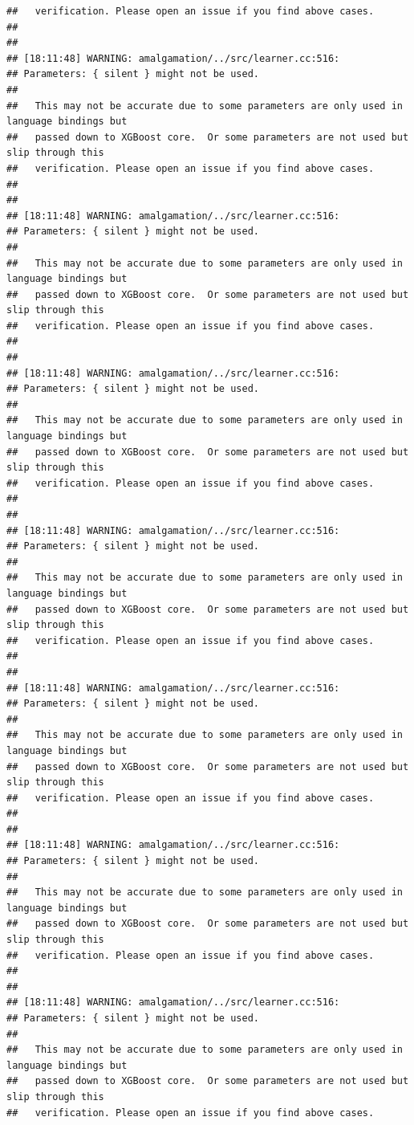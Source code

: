 \documentclass[AMS,STIX2COL]{WileyNJD-v2}\usepackage[]{graphicx}\usepackage[]{color}
\makeatletter
\newenvironment{kframe}{%
 \def\at@end@of@kframe{}%
 \ifinner\ifhmode%
  \def\at@end@of@kframe{\end{minipage}}%
  \begin{minipage}{\columnwidth}%
 \fi\fi%
 \def\FrameCommand##1{\hskip\@totalleftmargin \hskip-\fboxsep
 \colorbox{shadecolor}{##1}\hskip-\fboxsep
     \hskip-\linewidth \hskip-\@totalleftmargin \hskip\columnwidth}%
 \MakeFramed {\advance\hsize-\width
   \@totalleftmargin\z@ \linewidth\hsize
   \@setminipage}}%
 {\par\unskip\endMakeFramed%
 \at@end@of@kframe}
\newenvironment{knitrout}{}{} %
\makeatother
\begin{document}
\begin{knitrout}
\begin{kframe}
\begin{verbatim}
##   verification. Please open an issue if you find above cases.
## 
## 
## [18:11:48] WARNING: amalgamation/../src/learner.cc:516: 
## Parameters: { silent } might not be used.
## 
##   This may not be accurate due to some parameters are only used in language bindings but
##   passed down to XGBoost core.  Or some parameters are not used but slip through this
##   verification. Please open an issue if you find above cases.
## 
## 
## [18:11:48] WARNING: amalgamation/../src/learner.cc:516: 
## Parameters: { silent } might not be used.
## 
##   This may not be accurate due to some parameters are only used in language bindings but
##   passed down to XGBoost core.  Or some parameters are not used but slip through this
##   verification. Please open an issue if you find above cases.
## 
## 
## [18:11:48] WARNING: amalgamation/../src/learner.cc:516: 
## Parameters: { silent } might not be used.
## 
##   This may not be accurate due to some parameters are only used in language bindings but
##   passed down to XGBoost core.  Or some parameters are not used but slip through this
##   verification. Please open an issue if you find above cases.
## 
## 
## [18:11:48] WARNING: amalgamation/../src/learner.cc:516: 
## Parameters: { silent } might not be used.
## 
##   This may not be accurate due to some parameters are only used in language bindings but
##   passed down to XGBoost core.  Or some parameters are not used but slip through this
##   verification. Please open an issue if you find above cases.
## 
## 
## [18:11:48] WARNING: amalgamation/../src/learner.cc:516: 
## Parameters: { silent } might not be used.
## 
##   This may not be accurate due to some parameters are only used in language bindings but
##   passed down to XGBoost core.  Or some parameters are not used but slip through this
##   verification. Please open an issue if you find above cases.
## 
## 
## [18:11:48] WARNING: amalgamation/../src/learner.cc:516: 
## Parameters: { silent } might not be used.
## 
##   This may not be accurate due to some parameters are only used in language bindings but
##   passed down to XGBoost core.  Or some parameters are not used but slip through this
##   verification. Please open an issue if you find above cases.
## 
## 
## [18:11:48] WARNING: amalgamation/../src/learner.cc:516: 
## Parameters: { silent } might not be used.
## 
##   This may not be accurate due to some parameters are only used in language bindings but
##   passed down to XGBoost core.  Or some parameters are not used but slip through this
##   verification. Please open an issue if you find above cases.

\end{verbatim}
\end{kframe}
\end{knitrout}
\end{document}
